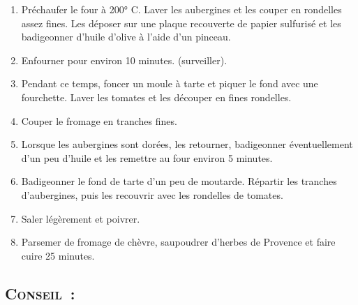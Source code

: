 \begin{enumerate}
\item Pr\'echaufer le four \`a 200° C. Laver les aubergines et les couper en rondelles assez fines. Les d\'eposer sur une plaque recouverte de papier sulfuris\'e et les badigeonner d'huile d'olive \`a l'aide d'un pinceau. 

\item Enfourner pour environ 10 minutes. (surveiller).

\item Pendant ce temps, foncer un moule \`a tarte et piquer le fond avec une fourchette. Laver les tomates et les d\'ecouper en fines rondelles. 

\item Couper le fromage en tranches fines.

\item Lorsque les aubergines sont dor\'ees, les retourner, badigeonner \'eventuellement d'un peu d'huile et les remettre au four environ 5 minutes.

\item Badigeonner le fond de tarte d'un peu de moutarde. R\'epartir les tranches d'aubergines, puis les recouvrir avec les rondelles de tomates. 

\item Saler l\'eg\`erement et poivrer. 

\item Parsemer de fromage de ch\`evre, saupoudrer d'herbes de Provence et faire cuire 25 minutes.
\end{enumerate}
\subsection*{\textsc{Conseil~:}}

